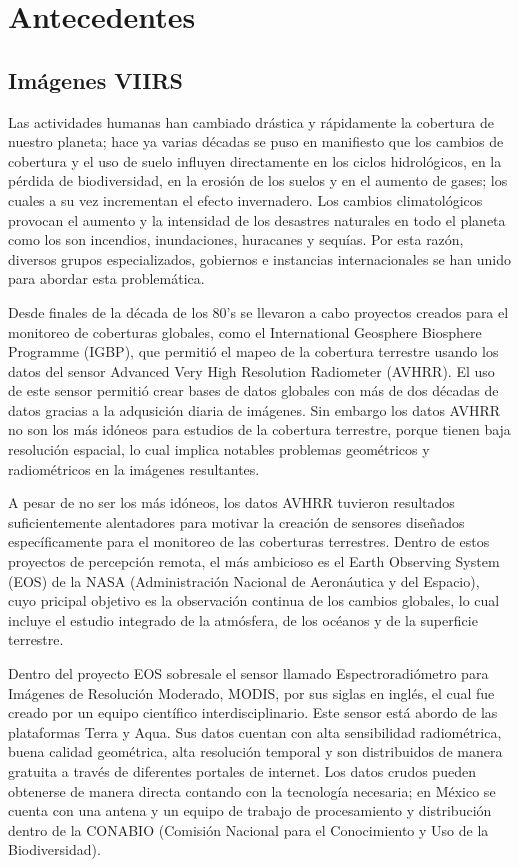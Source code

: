 \chapter{Antecedentes}

\section{Imágenes VIIRS}

Las actividades humanas han cambiado drástica y rápidamente la cobertura de nuestro planeta; hace ya varias décadas se puso en manifiesto que los cambios de cobertura y el uso de suelo influyen directamente en los ciclos hidrológicos, en la pérdida de biodiversidad, en la erosión de los suelos y en el aumento de gases; los cuales a su vez incrementan el efecto invernadero. Los cambios climatológicos provocan el aumento y la intensidad de los desastres naturales en todo el planeta como los son incendios, inundaciones, huracanes y sequías. Por esta razón, diversos grupos especializados, gobiernos e instancias internacionales se han unido para abordar esta problemática. 

Desde finales de la década de los 80's se llevaron a cabo proyectos creados para el monitoreo de coberturas globales, como el International Geosphere Biosphere Programme (IGBP), que permitió el mapeo de la cobertura terrestre usando los datos del sensor Advanced Very High Resolution Radiometer (AVHRR). El uso de este sensor permitió crear bases de datos globales con más de dos décadas de datos gracias a la adqusición diaria de imágenes. Sin embargo los datos AVHRR no son los más idóneos para estudios de la cobertura terrestre, porque tienen baja resolución espacial, lo cual implica notables problemas geométricos y radiométricos en la imágenes resultantes. 

A pesar de no ser los más idóneos, los datos AVHRR tuvieron resultados suficientemente alentadores para motivar la creación de sensores diseñados específicamente para el monitoreo de las coberturas terrestres. Dentro de estos proyectos de percepción remota, el más ambicioso es el Earth Observing System (EOS) de la NASA (Administración Nacional de Aeronáutica y del Espacio), cuyo pricipal objetivo es la observación continua de los cambios globales, lo cual incluye el estudio integrado de la atmósfera, de los océanos y de la superficie terrestre. 

Dentro del proyecto EOS sobresale el sensor llamado Espectroradiómetro para Imágenes de Resolución Moderado, MODIS, por sus siglas en inglés, el cual fue creado por un equipo científico interdisciplinario. Este sensor está abordo de las plataformas Terra y Aqua. Sus datos cuentan con alta sensibilidad radiométrica, buena calidad geométrica, alta resolución temporal y son distribuidos de manera gratuita a través de diferentes portales de internet. Los datos crudos pueden obtenerse de manera directa contando con la tecnología necesaria; en México se cuenta con una antena y un equipo de trabajo de procesamiento y distribución dentro de la CONABIO (Comisión Nacional para el Conocimiento y Uso de la Biodiversidad). 

